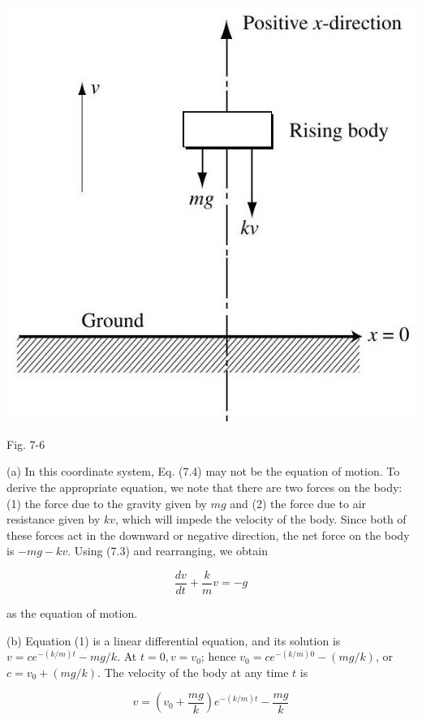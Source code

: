 \documentclass[10pt]{article}
\begin{document}
\begin{center}
\includegraphics[max width=\textwidth]{2024_04_03_5bb5b4275a64cb9887d1g-080}
\end{center}

Fig. 7-6

(a) In this coordinate system, Eq. (7.4) may not be the equation of motion. To derive the appropriate equation, we note that there are two forces on the body: (1) the force due to the gravity given by $m g$ and (2) the force due to air resistance given by $k v$, which will impede the velocity of the body. Since both of these forces act in the downward or negative direction, the net force on the body is $-m g-k v$. Using (7.3) and rearranging, we obtain


\begin{equation*}
\frac{d v}{d t}+\frac{k}{m} v=-g \tag{1}
\end{equation*}


as the equation of motion.

(b) Equation (1) is a linear differential equation, and its solution is $v=c e^{-(k / m) t}-m g / k$. At $t=0, v=v_{0}$; hence $v_{0}=c e^{-(k / m) 0}-(m g / k)$, or $c=v_{0}+(m g / k)$. The velocity of the body at any time $t$ is


\begin{equation*}
v=\left(v_{0}+\frac{m g}{k}\right) e^{-(k / m) t}-\frac{m g}{k} \tag{2}
\end{equation*}
\end{document}
